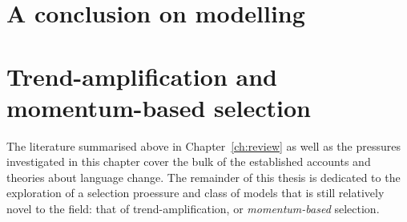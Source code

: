 




\section{A conclusion on modelling}


\section{Trend-amplification and momentum-based selection}

The literature summarised above in Chapter~\ref{ch:review} as well as the pressures investigated in this chapter cover the bulk of the established accounts and theories about language change.
The remainder of this thesis is dedicated to the exploration of a selection proessure and class of models that is still relatively novel to the field: that of trend-amplification, or \emph{momentum-based} selection.


